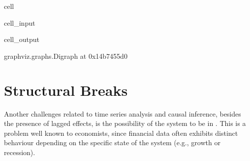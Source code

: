\documentclass[letterpaper,10pt,english]{jupyterBook}
\begin{document}
\begin{sphinxuseclass}{cell}\begin{sphinxVerbatimInput}

\begin{sphinxuseclass}{cell_input}
\begin{sphinxVerbatim}[commandchars=\\\{\}]
\PYG{p}{[} \PYG{p}{[}\PYG{p}{]}\PYG{p}{]}   
\end{sphinxVerbatim}

\end{sphinxuseclass}\end{sphinxVerbatimInput}
\begin{sphinxVerbatimOutput}

\begin{sphinxuseclass}{cell_output}
\begin{sphinxVerbatim}[commandchars=\\\{\}]
\PYGZlt{}graphviz.graphs.Digraph at 0x14b7455d0\PYGZgt{}
\end{sphinxVerbatim}

\end{sphinxuseclass}\end{sphinxVerbatimOutput}

\end{sphinxuseclass}
\sphinxstepscope


\chapter{Structural Breaks}
\label{\detokenize{notebooks/structural_breaks_example:structural-breaks}}\label{\detokenize{notebooks/structural_breaks_example::doc}}
\sphinxAtStartPar
Another challenges related to time series analysis and causal inference, besides the presence of lagged effects, is the possibility of the system to be in . This is a problem well known to economists, since financial data often exhibits distinct behaviour depending on the specific state of the system (e.g., growth or recession).
\end{document}
